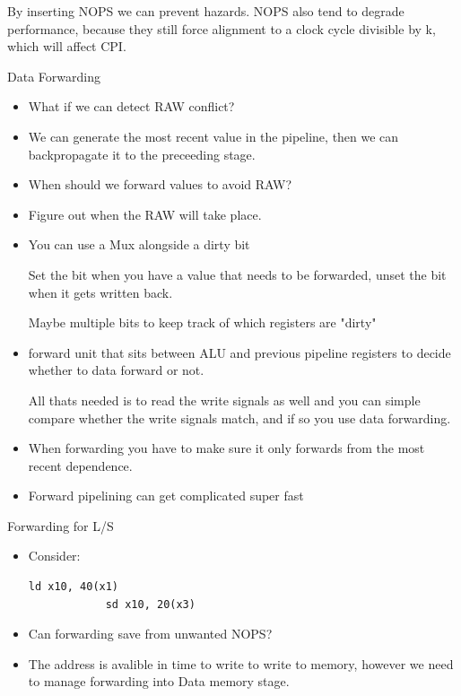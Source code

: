 \documentclass{report}
\begin{document}
\begin{description}
\begin{mdframed}
            By inserting NOPS we can prevent hazards.
            NOPS also tend to degrade performance, because they
            still force alignment to a clock cycle divisible by
            k, which will affect CPI.
        \end{mdframed}

    \item Data Forwarding
        \begin{itemize}
            \item What if we can detect RAW conflict?
            \item We can generate the most recent value in the
                pipeline, then we can backpropagate it to
                the preceeding stage.

            \item When should we forward values to avoid RAW?
            \item Figure out when the RAW will take place.
            \item You can use a Mux alongside a dirty bit

                Set the bit when you have a value that needs
                to be forwarded, unset the bit when it gets
                written back.

                Maybe multiple bits to keep track of which
                registers are "dirty"

            \item forward unit that sits between ALU and
                previous pipeline registers to decide whether
                to data forward or not.

                All thats needed is to read the write signals
                as well and you can simple compare whether the
                write signals match, and if so you use data
                forwarding.
            \item When forwarding you have to make sure it
                only forwards from the most recent dependence.
                
            \item Forward pipelining can get complicated
                super fast
        \end{itemize}
    \item Forwarding for L/S
        \begin{itemize}
            \item Consider:
                \begin{lstlisting}[language={[x86asm]Assembler}]
            ld x10, 40(x1)
            sd x10, 20(x3)
                \end{lstlisting}
            \item Can forwarding save from unwanted NOPS?
            \item The address is avalible in time to write
                to write to memory, however we need to manage
                forwarding into Data memory stage.


\end{itemize}
\end{description}
\end{document}
